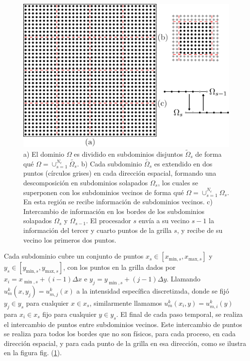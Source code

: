  \begin{figure}[h!]
  \centering
  \includegraphics[width=0.6\linewidth]{figuras/all.png}
  \caption{a) El dominio $\Omega$ es dividido en subdominios disjuntos $\widetilde{\Omega}_s$ de forma qué 
   $\Omega=\cup_{s=1}^{N_{c}}\widetilde{\Omega_s}$.
   b) Cada subdominio $\widetilde{\Omega_s}$ es extendido  
  en dos puntos (círculos grises) en cada dirección espacial, formando una descomposición en subdominios solapados $\Omega_s$, los cuales se superponen con los subdominios vecinos 
  de forma qué $\Omega=\cup_{s=1}^{N_{c}}\Omega_s$. 
  En esta región se recibe información de subdominios vecinos.
   c) Intercambio de información en los bordes de los subdominios solapados 
    $\Omega_s$ y $\Omega_{s-1}$. El 
   procesador $s$ envía a su vecino $s-1$ la información del tercer y cuarto puntos de la grilla $s$, y recibe de su vecino los primeros dos puntos.}
 \label{fig:bechange}
\end{figure}

 Cada subdominio cubre un conjunto de puntos  $x_s\in[x_{\text{min},s},x_{\text{max},s}]$ 
 y $y_s\in [y_{\text{min},s},y_{\text{max},s}]$, con los puntos 
 en la grilla dados por $x_i=x_{\min,s}+(i-1)\Delta x$ e $y_j=y_{\min,s}+(j-1)\Delta y$. 
 Llamando  $u_{m}^k(x,y_j)=u_{m,j}^k(x)$ a la intensidad específica discretizada,
  donde se fijó $y_j\in y_s$ para cualquier $x\in x_s$, similarmente llamamos $u_{m}^k(x_i,y)=u_{m,i}^k(y)$ 
  para $x_i\in x_s$ fijo para cualquier $y\in y_s$. El final de cada paso temporal, 
 se realiza el intercambio de puntos entre subdominios vecinos. 
 Este intercambio de puntos se realiza para todos los bordes que no son físicos, 
 para cada proceso, en cada dirección espacial, y para cada punto de la grilla 
 en esa dirección, como se ilustra en la figura fig. (\ref{fig:bechange}).

